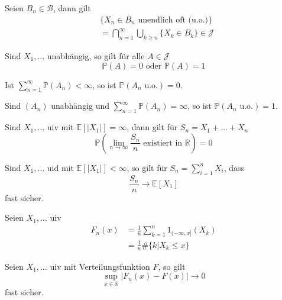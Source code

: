 \documentclass[prb,12pt, twocolumn]{revtex4-2}
\theoremstyle{definition}
\theoremstyle{definition}
\theoremstyle{definition}
\newcommand{\R}{\mathbb{R}}
\begin{document}
\begin{Note}
	Seien $B_n\in\mathcal{B}$, dann gilt
	\begin{align*}
	&\{X_n \in B_n \text{ unendlich oft (u.o.)}\}\\
	&=\bigcap_{n=1}^\infty \bigcup_{k\ge n}\{X_k \in B_k\}\in \mathcal{J}
\end{align*}
\end{Note}
\begin{Note}
	Sind $X_1, \dots$ unabh\"{a}ngig, so gilt f\"{u}r alle $A\in \mathcal{J}$
	\[\mathbb{P}(A)=0\text{ oder }\mathbb{P}(A)=1\]
\end{Note}
\begin{Note}
	Ist $\sum_{n=1}^\infty \mathbb{P}(A_n)<\infty$, so ist $\mathbb{P}(A_n\text{ u.o.})=0$.
\end{Note}
\begin{Note}
	Sind $(A_n)$ unabh\"{a}ngig und $\sum_{n=1}^\infty \mathbb{P}(A_n)=\infty$, so ist $\mathbb{P}(A_n\text{ u.o.})=1$.
\end{Note}
\begin{Note}
	Sind $X_1, \dots$ uiv mit $\mathbb{E}[|X_1|]=\infty$, dann gilt f\"{u}r $S_n = X_1 + \dots + X_n$
	\[\mathbb{P}\left(\lim_{n\to\infty} \frac{S_n}{n}\text{ existiert in }\R\right)=0\]
\end{Note}
\begin{Note}
	Sind $X_1, \dots$ uid mit $\mathbb{E}[|X_1|]<\infty$, so gilt f\"{u}r $S_n = \sum_{i=1}^n X_i$, dass
	\[\frac{S_n}{n}\to\mathbb{E}[X_1]\]
	fast sicher.
\end{Note}
\begin{Note}
	Seien $X_1, \dots$ uiv 
	\begin{align*}
	F_n(x) &=\frac 1n \sum_{k=1}^n 1_{(-\infty, x]}(X_k)\\
	 &= \frac 1n \#\{k|X_k \le x\}
\end{align*}
\end{Note}
\begin{Note}
	Seien $X_1, \dots$ uiv mit Verteilungsfunktion $F$, so gilt
	\[\sup_{x\in \R}|F_n(x) - F(x)|\to 0\]
	fast sicher.
\end{Note}
\end{document}
